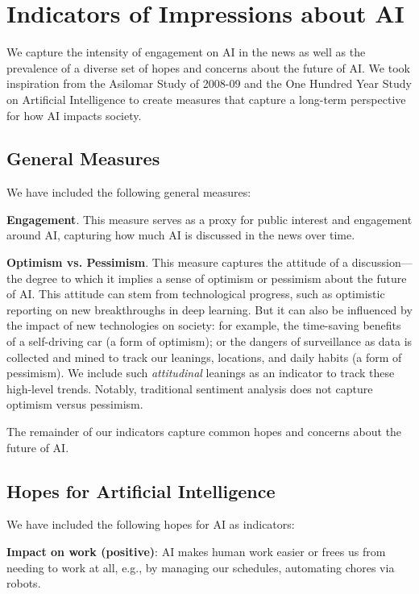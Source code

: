 \documentclass[letterpaper]{article}
\begin{document}
\section{Indicators of Impressions about AI}


We capture the intensity of engagement on AI in the news as well as the prevalence of a diverse set of hopes and concerns about the future of AI. We took inspiration from the Asilomar Study of 2008-09 \cite{asilomar} and the One Hundred Year Study on Artificial Intelligence \cite{100years} to create measures that capture a long-term perspective for how AI impacts society. %

\subsection{General Measures}
We have included the following general measures:

\textbf{Engagement}. This measure serves as a proxy for public interest and engagement around AI, capturing how much AI is discussed in the news over time.

\textbf{Optimism vs. Pessimism}. This measure captures the attitude of a discussion---the degree to which it implies a sense of optimism or pessimism about the future of AI. This attitude can stem from technological progress, such as optimistic reporting on new breakthroughs in deep learning. But it can also be influenced by the impact of new technologies on society: for example, the time-saving benefits of a self-driving car (a form of optimism); or the dangers of surveillance as data is collected and mined to track our leanings, locations, and daily habits (a form of pessimism). We include such \textit{attitudinal} leanings as an indicator to track these high-level trends. Notably, traditional sentiment analysis does not capture optimism versus pessimism. 

The remainder of our indicators capture common hopes and concerns about the future of AI.

\subsection{Hopes for Artificial Intelligence}

We have included the following hopes for AI as indicators:

\textbf{Impact on work (positive)}: AI makes human work easier or frees us from needing to work at all, e.g., by managing our schedules, automating chores via robots.
\end{document}
